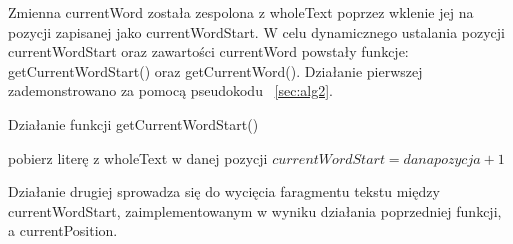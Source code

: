 \documentclass[twoside,a4paper]{book}
\begin{document}
Zmienna currentWord została zespolona z wholeText poprzez wklenie jej na pozycji zapisanej jako currentWordStart. 
W celu dynamicznego ustalania pozycji currentWordStart oraz zawartości currentWord powstały funkcje: getCurrentWordStart() oraz getCurrentWord(). Działanie pierwszej zademonstrowano za pomocą pseudokodu ~\ref{sec:alg2}.
\begin{algorithm}
\caption{Działanie funkcji getCurrentWordStart()}
\label{sec:alg2}
\begin{algorithmic}
\STATE pobierz literę z wholeText w danej pozycji
\STATE $currentWordStart = dana pozycja + 1$
\ENDIF
\ENDFOR
\ENDIF
\end{algorithmic}
\end{algorithm}
Działanie drugiej sprowadza się do wycięcia faragmentu tekstu między currentWordStart, zaimplementowanym w wyniku działania poprzedniej funkcji, a currentPosition.
\end{document}
